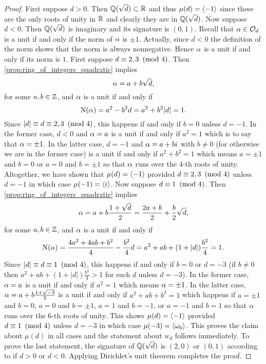     \begin{proof}
        First suppose $d > 0$. Then $\mathbb{Q}(\sqrt{d}) \subset \mathbb{R}$ and thus $\mu(d) = \langle-1\rangle$ since these are the only roots of unity in $\mathbb{R}$ and clearly they are in $\mathbb{Q}(\sqrt{d})$. Now suppose $d < 0$. Then $\mathbb{Q}(\sqrt{d})$ is imaginary and its signature is $(0,1)$. Recall that $\alpha \in \mathcal{O}_{d}$ is a unit if and only if the norm of $\alpha$ is $\pm 1$. Actually, since $d < 0$ the definition of the norm shows that the norm is always nonnegative. Hence $\alpha$ is a unit if and only if its norm is $1$. First suppose $d \equiv 2,3 \ \left(\text{mod }4\right)$. Then \cref{prop:ring_of_integers_quadratic} implies
      \[
        \alpha = a+b\sqrt{d},
      \]
      for some $a,b \in \mathbb{Z}$, and $\alpha$ is a unit if and only if
      \[
        \operatorname{\mathrm{N}}(\alpha) = a^{2}-b^{2}d = a^{2}+b^{2}|d| = 1.
      \]
      Since $|d| \equiv d \equiv 2,3 \ \left(\text{mod }4\right)$, this happens if and only if $b = 0$ unless $d = -1$. In the former case, $d < 0$ and $\alpha = a$ is a unit if and only if $a^{2} = 1$ which is to say that $\alpha = \pm 1$. In the latter case, $d = -1$ and $\alpha = a+bi$ with $b \neq 0$ (for otherwise we are in the former case) is a unit if and only if $a^{2}+b^{2} = 1$ which means $a = \pm1$ and $b = 0$ or $a = 0$ and $b = \pm 1$ so that $\alpha$ runs over the $4$-th roots of unity. Altogether, we have shown that $\mu(d) = \langle-1\rangle$ provided $d \equiv 2,3 \ \left(\text{mod }4\right)$ unless $d = -1$ in which case $\mu(-1) = \langle i\rangle$. Now suppose $d \equiv 1 \ \left(\text{mod }4\right)$. Then \cref{prop:ring_of_integers_quadratic} implies
      \[
        \alpha = a+b\frac{1+\sqrt{d}}{2} = \frac{2a+b}{2}+\frac{b}{2}\sqrt{d},
      \]
      for some $a,b \in \mathbb{Z}$, and $\alpha$ is a unit if and only if
      \[
        \operatorname{\mathrm{N}}(\alpha) = \frac{4a^{2}+4ab+b^{2}}{4}-\frac{b^{2}}{4}d = a^{2}+ab+(1+|d|)\frac{b^{2}}{4} = 1.
      \]
      Since $|d| \equiv d \equiv 1 \ \left(\text{mod }4\right)$, this happens if and only if $b = 0$ or $d = -3$ (if $b \neq 0$ then $a^{2}+ab+(1+|d|)\frac{b^{2}}{4} > 1$ for such $d$ unless $d = -3$). In the former case, $\alpha = a$ is a unit if and only if $a^{2} = 1$ which means $\alpha = \pm1$. In the latter case, $\alpha = a+b\frac{1+\sqrt{-3}}{2}$ is a unit if and only if $a^{2}+ab+b^{2} = 1$ which happens if $a = \pm 1$ and $b = 0$, $a = 0$ and $b = \pm 1$, $a = 1$ and $b = -1$, or $a = -1$ and $b = 1$ so that $\alpha$ runs over the $6$-th roots of unity. This shows $\mu(d) = \langle-1\rangle$ provided $d \equiv 1 \ \left(\text{mod }4\right)$ unless $d = -3$ in which case $\mu(-3) = \langle\omega_{6}\rangle$. This proves the claim about $\mu(d)$ in all cases and the statement about $w_{d}$ follows immediately. To prove the last statement, the signature of $\mathbb{Q}(\sqrt{d})$ is $(2,0)$ or $(0,1)$ according to if $d > 0$ or $d < 0$. Applying Dirichlet's unit theorem completes the proof.
    \end{proof}

